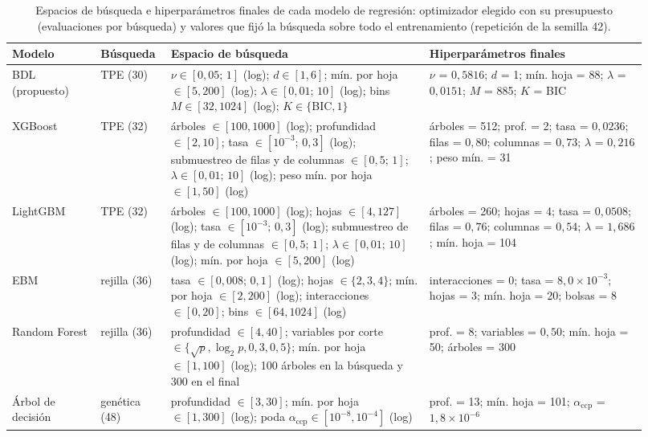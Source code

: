 \begin{table}[tbp]
  \centering\scriptsize\setlength{\tabcolsep}{3pt}
  \caption{Espacios de búsqueda e hiperparámetros finales de cada modelo de regresión: optimizador elegido con su presupuesto (evaluaciones por búsqueda) y valores que fijó la búsqueda sobre todo el entrenamiento (repetición de la semilla 42).}
  \label{tab:hiperparametros}
  \begin{tabular}{>{\raggedright\arraybackslash}p{0.13\linewidth} >{\raggedright\arraybackslash}p{0.09\linewidth} >{\raggedright\arraybackslash}p{0.38\linewidth} >{\raggedright\arraybackslash}p{0.32\linewidth}}
    \toprule
    Modelo & Búsqueda & Espacio de búsqueda & Hiperparámetros finales \\
    \midrule
    BDL (propuesto) & TPE (30) & $\nu \in [0{,}05;\,1]$ (log); $d \in [1, 6]$; mín. por hoja $\in [5, 200]$ (log); $\lambda \in [0{,}01;\,10]$ (log); bins $M \in [32, 1024]$ (log); $K \in \{$BIC$, 1\}$ & $\nu$ = $0{,}5816$; $d$ = 1; mín. hoja = 88; $\lambda$ = $0{,}0151$; $M$ = 885; $K$ = BIC \\
    XGBoost & TPE (32) & árboles $\in [100, 1000]$ (log); profundidad $\in [2, 10]$; tasa $\in [10^{-3};\,0{,}3]$ (log); submuestreo de filas y de columnas $\in [0{,}5;\,1]$; $\lambda \in [0{,}01;\,10]$ (log); peso mín. por hoja $\in [1, 50]$ (log) & árboles = 512; prof. = 2; tasa = $0{,}0236$; filas = $0{,}80$; columnas = $0{,}73$; $\lambda$ = $0{,}216$; peso mín. = 31 \\
    LightGBM & TPE (32) & árboles $\in [100, 1000]$ (log); hojas $\in [4, 127]$ (log); tasa $\in [10^{-3};\,0{,}3]$ (log); submuestreo de filas y de columnas $\in [0{,}5;\,1]$; $\lambda \in [0{,}01;\,10]$ (log); mín. por hoja $\in [5, 200]$ (log) & árboles = 260; hojas = 4; tasa = $0{,}0508$; filas = $0{,}76$; columnas = $0{,}54$; $\lambda$ = $1{,}686$; mín. hoja = 104 \\
    EBM & rejilla (36) & tasa $\in [0{,}008;\,0{,}1]$ (log); hojas $\in \{2, 3, 4\}$; mín. por hoja $\in [2, 200]$ (log); interacciones $\in [0, 20]$; bins $\in [64, 1024]$ (log) & interacciones = 0; tasa = $8{,}0 \times 10^{-3}$; hojas = 3; mín. hoja = 20; bolsas = 8 \\
    Random Forest & rejilla (36) & profundidad $\in [4, 40]$; variables por corte $\in \{\sqrt{p}, \log_2 p, 0{,}3, 0{,}5\}$; mín. por hoja $\in [1, 100]$ (log); 100 árboles en la búsqueda y 300 en el final & prof. = 8; variables = $0{,}50$; mín. hoja = 50; árboles = 300 \\
    Árbol de decisión & genética (48) & profundidad $\in [3, 30]$; mín. por hoja $\in [1, 300]$ (log); poda $\alpha_{\mathrm{ccp}} \in [10^{-8}, 10^{-4}]$ (log) & prof. = 13; mín. hoja = 101; $\alpha_{\mathrm{ccp}}$ = $1{,}8 \times 10^{-6}$ \\

\end{tabular}
\end{table}
